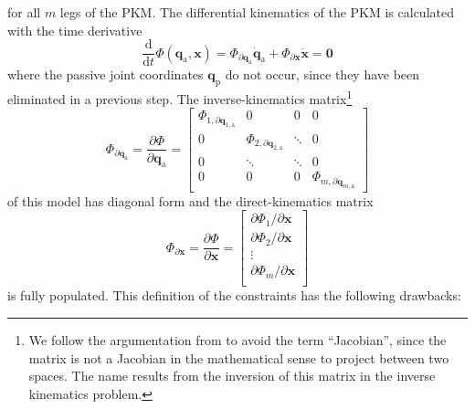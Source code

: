 \documentclass[robotics,article,accept,moreauthors,pdftex]{Definitions/mdpi}
\newcommand{\bm}[1]{\boldsymbol{#1}}
\let\Phi\varPhi
\begin{document}
%
for all $m$ legs of the PKM.
The differential kinematics of the PKM is calculated with the time derivative
%
\begin{equation}
\frac{\mathrm{d}}{{\mathrm{d}}t} \bm{\Phi}(\bm{q}_\mathrm{a},\bm{x})
=
\bm{\Phi}_{\partial \bm{q}_\mathrm{a}} \dot{\bm{q}}_\mathrm{a}
+
\bm{\Phi}_{\partial \bm{x}} \dot{\bm{x}}
=
\bm{0}
\label{equ:constr_qa_diff}
\end{equation}
%
where the passive joint coordinates $\bm{q}_{\mathrm{p}}$ do not occur, since they have been eliminated in a previous step.
The inverse-kinematics matrix\footnote{We follow the argumentation from \cite{Gogu2008} to avoid the term ``Jacobian'', since the matrix is not a Jacobian in the mathematical sense to project between two spaces. The name results from the inversion of this matrix in the inverse kinematics problem.}
%
\begin{equation}
\bm{\Phi}_{\partial \bm{q}_{\mathrm{a}}}
=
\frac{\partial \bm{\Phi}}{\partial \bm{q}_{\mathrm{a}}}
=
\begin{bmatrix}
\Phi_{1,\partial \bm{q}_{1,\mathrm{a}}} & 0 & 0 & 0\\
0 & \Phi_{2,\partial \bm{q}_{2,\mathrm{a}}} & \ddots & 0 \\
0 & \ddots & \ddots & 0 \\
0 & 0 & 0 & \Phi_{m,\partial \bm{q}_{m,\mathrm{a}}}
\end{bmatrix}
\label{equ:PKM_phi_grad_q}
\end{equation}
%
of this model has diagonal form and the direct-kinematics matrix
%
\begin{equation}
\bm{\Phi}_{\partial \bm{x}}
=
\frac{\partial \bm{\Phi}}{\partial \bm{x}}
=
\begin{bmatrix}
\partial \Phi_1/\partial \bm{x}\\
\partial \Phi_2/\partial \bm{x}\\
\vdots \\
\partial \Phi_m/\partial \bm{x}\\
\end{bmatrix}
\label{equ:PKM_phi_grad_x}
\end{equation}
%
is fully populated.
This definition of the constraints has the following drawbacks:
\end{document}
